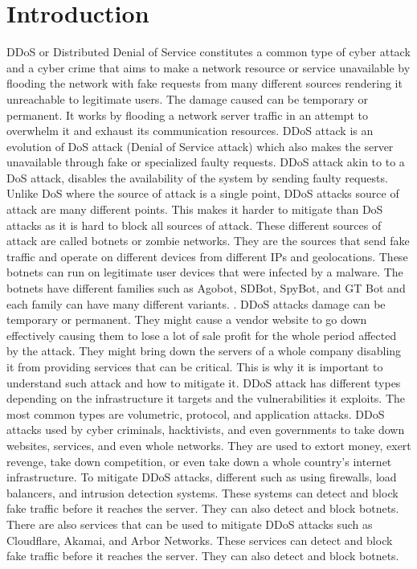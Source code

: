 \documentclass[a4paper, 12pt]{report} %
\begin{document}
    \section{Introduction}
        DDoS or Distributed Denial of Service constitutes a common type of cyber attack and a cyber crime that aims to make a network resource or service unavailable by flooding the network with fake requests from many different sources rendering it unreachable to legitimate users. The damage caused can be temporary or permanent. It works by flooding a network server traffic in an attempt to overwhelm it and exhaust its communication resources. DDoS attack is an evolution of DoS attack (Denial of Service attack) which also makes the server unavailable through fake or specialized faulty requests. DDoS attack akin to to a DoS attack, disables the availability of the system by sending faulty requests. Unlike DoS where the source of attack is a single point, DDoS attacks source of attack are many different points. This makes it harder to mitigate than DoS attacks as it is hard to block all sources of attack. These different sources of attack are called botnets or zombie networks. They are the sources that send fake traffic and operate on different devices from different IPs and geolocations. These botnets can run on legitimate user devices that were infected by a malware. The botnets have different families such as Agobot, SDBot, SpyBot, and GT Bot \cite{10.1007/978-0-387-44599-1_8} and each family can have many different variants. \cite{ddos_evolution}.
        DDoS attacks damage can be temporary or permanent. They might cause a vendor website to go down effectively causing them to lose a lot of sale profit for the whole period affected by the attack. They might bring down the servers of a whole company disabling it from providing services that can be critical. This is why it is important to understand such attack and how to mitigate it.
        DDoS attack has different types depending on the infrastructure it targets and the vulnerabilities it exploits. The most common types are volumetric, protocol, and application attacks. 
        DDoS attacks used by cyber criminals, hacktivists, and even governments to take down websites, services, and even whole networks. They are used to extort money, exert revenge, take down competition, or even take down a whole country's internet infrastructure.
        To mitigate DDoS attacks, different such as using firewalls, load balancers, and intrusion detection systems. These systems can detect and block fake traffic before it reaches the server. They can also detect and block botnets. There are also services that can be used to mitigate DDoS attacks such as Cloudflare, Akamai, and Arbor Networks. These services can detect and block fake traffic before it reaches the server. They can also detect and block botnets.
\end{document}
